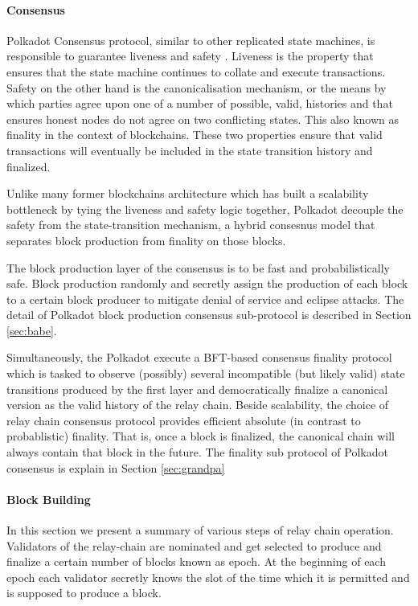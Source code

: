 \paragraph{Consensus}

Polkadot Consensus protocol, similar to other replicated state machines, is responsible to guarantee liveness and safety . Liveness is the property that ensures that the state machine continues to collate and execute transactions. Safety on the other hand is the canonicalisation mechanism, or the means by which parties agree upon one of a number of possible, valid, histories and that ensures honest nodes do not agree on two conflicting states. This also known as finality in the context of blockchains. These two properties ensure that valid transactions will eventually be included in the state transition history and finalized.

Unlike many former blockchains architecture which has built a scalability bottleneck by tying the liveness and safety logic together, Polkadot decouple the safety from the state-transition mechanism, a hybrid consesnus model that separates block production from finality on those blocks.

The block production layer of the consensus is to be fast and probabilistically safe. Block production randomly and secretly assign the production of each block to a certain block producer to mitigate denial of service and eclipse attacks. The detail of Polkadot block production consensus sub-protocol is described in Section \ref{sec:babe}.

Simultaneously, the Polkadot execute a BFT-based consensus finality protocol which is tasked to observe (possibly) several incompatible (but likely valid) state transitions produced by the first layer and democratically finalize a canonical version as the valid history of the relay chain. Beside scalability, the choice of relay chain consensus protocol provides efficient absolute (in contrast to probablistic) finality. That is, once a block is finalized, the canonical chain will always contain that block in the future. The finality sub protocol of Polkadot consensus is explain in Section \ref{sec:grandpa}

\paragraph{Block Building}\label{sec:relaychainblockproduction}

In this section we present a summary of various steps of relay chain operation. Validators of the relay-chain are nominated and get selected to produce and finalize a certain number of blocks known as epoch. At the beginning of each epoch each validator secretly knows the slot of the time which it is permitted and is supposed to produce a block.


